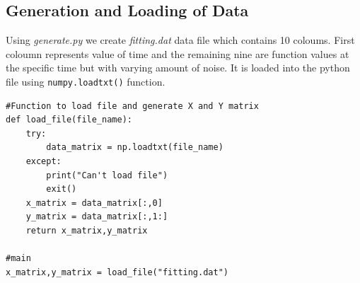 \documentclass[11pt, a4paper]{article}
\begin{document}
\subsection{Generation and Loading of Data}
\par Using \emph{generate.py} we create \emph{fitting.dat} data file which contains 10 coloums. First coloumn represents value of time and the remaining nine are function values at the specific time but with varying amount of noise. It is loaded into the python file using \verb|numpy.loadtxt()| function.

\begin{lstlisting}
#Function to load file and generate X and Y matrix
def load_file(file_name):
	try:
		data_matrix = np.loadtxt(file_name)
	except:
		print("Can't load file")
		exit()
	x_matrix = data_matrix[:,0]
	y_matrix = data_matrix[:,1:]
	return x_matrix,y_matrix

#main
x_matrix,y_matrix = load_file("fitting.dat")
\end{lstlisting}
\end{document}
